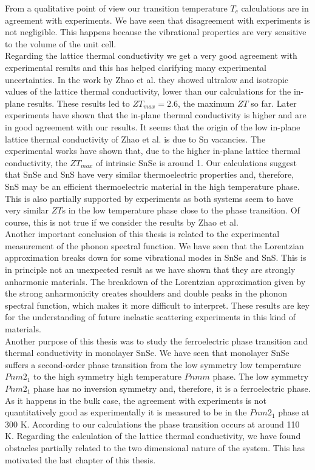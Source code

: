 From a qualitative point of view our transition temperature $T_{c}$ calculations are in agreement with experiments. 
We have seen that disagreement with experiments is not negligible. This happens 
because the vibrational properties are very sensitive to the volume of the unit cell. \\

Regarding the lattice thermal 
conductivity we get a very good agreement with experimental results and this has helped clarifying many experimental 
uncertainties. In the work by Zhao et al.\cite{zhao2014ultralow} they showed ultralow and isotropic values of the 
lattice thermal conductivity, lower than our calculations for the in-plane results. These results led to 
$ZT_{max}=2.6$, the maximum $ZT$ so far. Later 
experiments\cite{ibrahim2017reinvestigation,wei2019thermoelectric} have shown that the in-plane thermal conductivity 
is higher and are in good agreement with our results. It seems that the origin of the low in-plane lattice thermal 
conductivity of Zhao et al. is due to Sn vacancies. The experimental works have shown that, due to the higher 
in-plane lattice thermal conductivity, the $ZT_{max}$ of intrinsic SnSe is around 1. Our calculations suggest that 
SnSe and SnS have very similar thermoelectric properties and, therefore, SnS may be an efficient thermoelectric 
material in the high temperature phase. This is also partially supported by experiments as both systems seem to have 
very similar $ZT$s in the low temperature phase close to the phase transition. Of course, this is not true if we 
consider the results by Zhao et al. \\

Another important conclusion of this thesis is related to the experimental measurement of the phonon spectral 
function. We have seen that the Lorentzian approximation breaks down for some vibrational modes in SnSe and SnS. 
This is in principle not an unexpected result as we have shown that they are strongly anharmonic materials. The 
breakdown of the Lorentzian approximation given by the strong anharmonicity creates shoulders and double peaks in 
the phonon spectral function, which makes it more difficult to interpret. These results are key for the 
understanding of future inelastic scattering experiments in this kind of materials. \\

Another purpose of this thesis was to study the ferroelectric phase transition and thermal conductivity in monolayer 
SnSe. We have seen that monolayer SnSe suffers a second-order phase transition from the low symmetry low temperature 
$Pnm2_{1}$ to the high symmetry high temperature $Pnmm$ phase. The low symmetry $Pnm2_{1}$ phase has no inversion 
symmetry and, therefore, it is a ferroelectric phase. As it happens in the bulk case, the agreement with 
experiments is not quantitatively good as experimentally it is measured to be in the $Pnm2_{1}$ phase at 300 K. 
According to our calculations the phase transition occurs at around 110 K. Regarding the calculation of the lattice 
thermal conductivity, we have found obstacles partially related to the two dimensional nature of the system. This has 
motivated the last chapter of this thesis. \\

